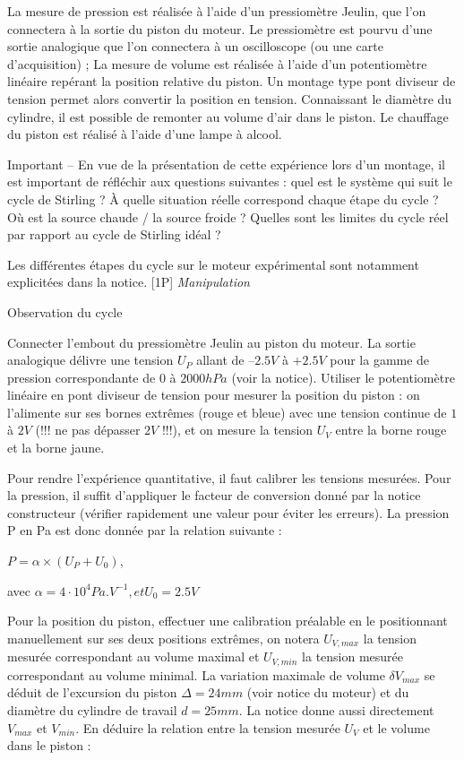 \documentclass{article}%
\begin{document}
    La mesure de pression est réalisée à l'aide d'un pressiomètre Jeulin, que l'on connectera à la sortie du piston du moteur. Le pressiomètre est pourvu d'une sortie analogique que l'on connectera à un oscilloscope (ou une carte d'acquisition) ;
    La mesure de volume est réalisée à l'aide d'un potentiomètre linéaire repérant la position relative du piston. Un montage type pont diviseur de tension permet alors convertir la position en tension. Connaissant le diamètre du cylindre, il est possible de remonter au volume d'air dans le piston.
    Le chauffage du piston est réalisé à l'aide d'une lampe à alcool.

Important -- En vue de la présentation de cette expérience lors d'un montage, il est important de réfléchir aux questions suivantes : quel est le système qui suit le cycle de Stirling ? À quelle situation réelle correspond chaque étape du cycle ? Où est la source chaude / la source froide ? Quelles sont les limites du cycle réel par rapport au cycle de Stirling idéal ?

Les différentes étapes du cycle sur le moteur expérimental sont notamment explicitées dans la notice.
[1P] \textit{Manipulation}

Observation du cycle

    Connecter l'embout du pressiomètre Jeulin au piston du moteur. La sortie analogique délivre une tension $U_P$ allant de $–2.5 V$ à $+2.5 V$ pour la gamme de pression correspondante de $0$ à $2000 hPa$ (voir la notice).
    Utiliser le potentiomètre linéaire en pont diviseur de tension pour mesurer la position du piston : on l'alimente sur ses bornes extrêmes (rouge et bleue) avec une tension continue de $1$ à $2 V$ (!!! ne pas dépasser $2V$ !!!), et on mesure la tension $U_V$ entre la borne rouge et la borne jaune.

Pour rendre l'expérience quantitative, il faut calibrer les tensions mesurées. Pour la pression, il suffit d'appliquer le facteur de conversion donné par la notice constructeur (vérifier rapidement une valeur pour éviter les erreurs). La pression P en Pa est donc donnée par la relation suivante :

$P=\alpha \times (U_P+U_0)$,

avec $\alpha = 4 \cdot 10^4 Pa.V^{-1}, et U_0=2.5 V$

Pour la position du piston, effectuer une calibration préalable en le positionnant manuellement sur ses deux positions extrêmes, on notera $U_{V,max}$ la tension mesurée correspondant au volume maximal et $U_{V,min}$ la tension mesurée correspondant au volume minimal. La variation maximale de volume $\delta V_{max}$ se déduit de l'excursion du piston $\Delta =24 mm$ (voir notice du moteur) et du diamètre du cylindre de travail $d=25 mm$. La notice donne aussi directement $V_{max}$ et $V_{min}$. En déduire la relation entre la tension mesurée $U_V$ et le volume dans le piston :
\end{document}
